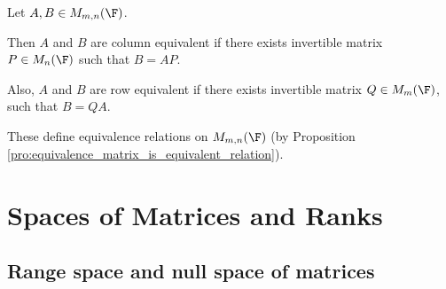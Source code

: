 \begin{definition}
Let $A,B \in M_{m,n}(\F)$. 

Then $A$ and $B$ are column equivalent if there exists invertible matrix $P \in M_{n}(\F)$ such that $B =AP$. 

Also, $A$ and $B$ are row equivalent if there exists invertible matrix $Q \in M_{m}(\F)$, such that $B = QA$. 
\end{definition}

\begin{remark}
These define equivalence relations on $M_{m,n}(\F)$ (by Proposition \ref{pro:equivalence_matrix_is_equivalent_relation}).
\end{remark}



\section{Spaces of Matrices and Ranks}

\subsection{Range space and null space of matrices}

